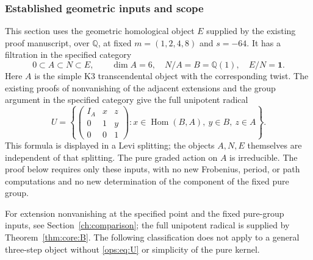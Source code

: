 \documentclass[11pt,a4paper,oneside]{article}
\theoremstyle{plain}
\theoremstyle{definition}
\theoremstyle{remark}
\newcommand{\Q}{\mathbb Q}
\newcommand{\Hom}{\operatorname{Hom}}
\numberwithin{equation}{section}
\begin{document}
\subsubsection{Established geometric inputs and scope}
This section uses the geometric homological object $E$ supplied by the existing proof manuscript, over $\Q$,
at fixed $m=(1,2,4,8)$ and $s=-64$. It has a filtration in the specified category
\begin{equation}\label{ops:eq:banana}
 0\subset A\subset N\subset E,
 \qquad \dim A=6,\quad N/A=B=\Q(1),\quad E/N=\mathbf1.
\end{equation}
Here $A$ is the simple K3 transcendental object with the corresponding twist.
The existing proofs of nonvanishing of the adjacent extensions and the group argument in the specified category give the full unipotent radical
\begin{equation}\label{ops:eq:U}
 U=\left\{
 \begin{pmatrix}I_A&x&z\\0&1&y\\0&0&1\end{pmatrix}
 :x\in\Hom(B,A),\ y\in B,\ z\in A\right\}.
\end{equation}
This formula is displayed in a Levi splitting; the objects $A,N,E$ themselves are independent of that splitting.
The pure graded action on $A$ is irreducible. The proof below requires only these inputs,
with no new Frobenius, period, or path computations and no new determination of the component of the fixed pure group.

For extension nonvanishing at the specified point and the fixed pure-group inputs, see Section~\ref{ch:comparison}; the full unipotent radical is supplied by Theorem~\ref{thm:core:B}.
The following classification does not apply to a general three-step object without \eqref{ops:eq:U} or simplicity of the pure kernel.
\end{document}
